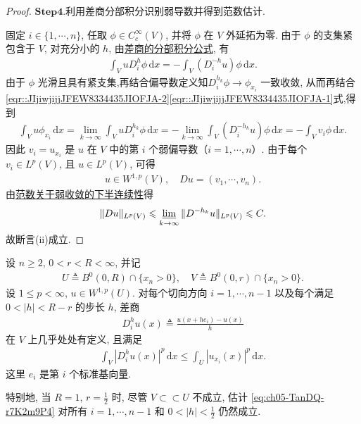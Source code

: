 \documentclass[../../main.tex]{subfiles}
\begin{document}
\begin{proof}
\noindent$\mathbf{Step}\bm{4}$.{\heiti 利用差商分部积分识别弱导数并得到范数估计.}

固定 $i\in\{1,\cdots,n\}$, 任取 $\phi\in C_c^\infty(V)$, 并将 $\phi$ 在 $V$ 外延拓为零.
由于 $\phi$ 的支集紧包含于 $V$, 对充分小的 $h$, 由\hyperref[theorem:ch05-差商的分部积分公式]{差商的分部积分公式}, 有
\begin{align}
\int_VuD_i^h\phi\,\mathrm{d}x
=
-\int_V(D_i^{-h}u)\phi\,\mathrm{d}x.
\label{eqr::JIjiwjijjJFEW8334435JIOFJA-1}
\end{align}
由于 $\phi$ 光滑且具有紧支集,再结合偏导数定义知$D_i^{h_k}\phi\to\phi_{x_i}$ 一致收敛, 从而再结合\eqref{eqr::JIjiwjijjJFEW8334435JIOFJA-2}\eqref{eqr::JIjiwjijjJFEW8334435JIOFJA-1}式,得到
\begin{align*}
\int_Vu\phi_{x_i}\,\mathrm{d}x
=
\lim\limits_{k\to\infty}
\int_VuD_i^{h_k}\phi\,\mathrm{d}x
=
-\lim\limits_{k\to\infty}
\int_V(D_i^{-h_k}u)\phi\,\mathrm{d}x
=
-\int_Vv_i\phi\,\mathrm{d}x.
\end{align*}
因此 $v_i=u_{x_i}$ 是 $u$ 在 $V$ 中的第 $i$ 个弱偏导数（$i=1,\cdots,n$）.
由于每个 $v_i\in L^p(V)$, 且 $u\in L^p(V)$, 可得
\begin{align*}
u\in W^{1,p}(V),\quad Du=(v_1,\cdots,v_n).
\end{align*}
由\hyperref[Functional Analysis-proposition:范数关于弱收敛的下半连续性]{范数关于弱收敛的下半连续性}得
\begin{align*}
\|Du\|_{L^p(V)}
\leqslant
\varliminf\limits_{k\to\infty}
\|D^{-h_k}u\|_{L^p(V)}
\leqslant C.
\end{align*}
故断言(ii)成立.
\end{proof}

\begin{proposition}[平直边界附近的切向差商估计]\label{proposition:ch05-平直边界附近的切向差商估计}
设 $n\geqslant2$, $0<r<R<\infty$, 并记
\begin{align*}
U\triangleq B^{0}(0,R)\cap\{x_n>0\},\quad
V\triangleq B^{0}(0,r)\cap\{x_n>0\}.
\end{align*}
设 $1\leqslant p<\infty$, $u\in W^{1,p}(U)$. 对每个切向方向 $i=1,\cdots,n-1$ 以及每个满足 $0<|h|<R-r$ 的步长 $h$, 差商
\begin{align*}
D_i^h u(x)\triangleq\frac{u(x+he_i)-u(x)}{h}
\end{align*}
在 $V$ 上几乎处处有定义, 且满足
\begin{align}\label{eq:ch05-TanDQ-r7K2m9P4}
\int_V|D_i^h u(x)|^p\,\mathrm{d}x
\leqslant
\int_U|u_{x_i}(x)|^p\,\mathrm{d}x.
\end{align}
这里 $e_i$ 是第 $i$ 个标准基向量.

特别地, 当 $R=1$, $r=\frac{1}{2}$ 时, 尽管 $V\subset\subset U$ 不成立, 估计 \eqref{eq:ch05-TanDQ-r7K2m9P4} 对所有 $i=1,\cdots,n-1$ 和 $0<|h|<\frac{1}{2}$ 仍然成立.
\end{proposition}
\end{document}
